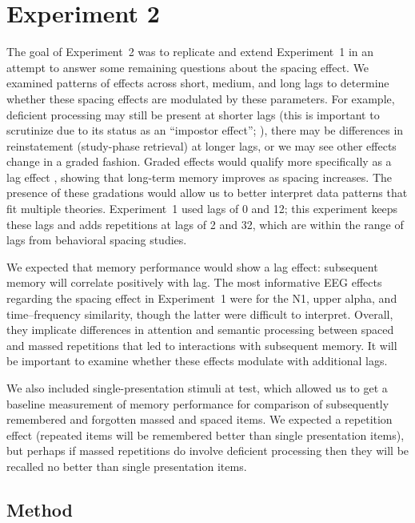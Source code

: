 
\chapter{Experiment 2}

The goal of Experiment~2 was to replicate and extend Experiment~1 in an attempt to answer some remaining questions about the spacing effect.  We examined patterns of effects across short, medium, and long lags to determine whether these spacing effects are modulated by these parameters.  For example, deficient processing may still be present at shorter lags (this is important to scrutinize due to its status as an ``impostor effect''; ), there may be differences in reinstatement (study-phase retrieval) at longer lags, or we may see other effects change in a graded fashion.  Graded effects would qualify more specifically as a lag effect \cite{Gree1989a,KahaHowa2005}, showing that long-term memory improves as spacing increases.
The presence of these gradations would allow us to better interpret data patterns that fit multiple theories.  Experiment~1 used lags of 0 and 12; this experiment keeps these lags and adds repetitions at lags of 2 and 32, which are within the range of lags from behavioral spacing studies.

We expected that memory performance would show a lag effect: subsequent memory will correlate positively with lag.  The most informative EEG effects regarding the spacing effect in Experiment~1 were for the N1, upper alpha, and time--frequency similarity, though the latter were difficult to interpret.  Overall, they implicate differences in attention and semantic processing between spaced and massed repetitions that led to interactions with subsequent memory.  It will be important to examine whether these effects modulate with additional lags.

We also included single-presentation stimuli at test, which allowed us to get a baseline measurement of memory performance for comparison of subsequently remembered and forgotten massed and spaced items.  We expected a repetition effect (repeated items will be remembered better than single presentation items), but perhaps if massed repetitions do involve deficient processing then they will be recalled no better than single presentation items.

\section{Method}

